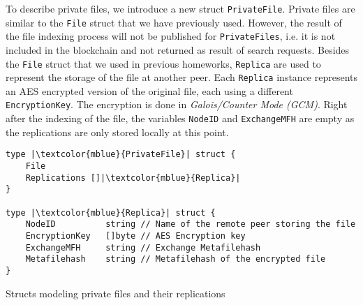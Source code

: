 \documentclass{article}
\begin{document}

To describe private files, we introduce a new struct \texttt{PrivateFile}. Private files are similar to the \texttt{File} struct that we have previously used. However, the result of the file indexing process will not be published for \texttt{PrivateFiles}, i.e. it is not included in the blockchain and not returned as result of search requests. 
Besides the \texttt{File} struct that we used in previous homeworks, \texttt{Replica} are used to represent the storage of the file at another peer. Each \texttt{Replica} instance represents an AES encrypted version of the original file, each using a different \texttt{EncryptionKey}. The encryption is done in \emph{Galois/Counter Mode (GCM)}. Right after the indexing of the file, the variables \texttt{NodeID} and \texttt{ExchangeMFH} are empty as the replications are only stored locally at this point. \\\vspace{0.5em}

\begin{listing}
\begin{verbatim}
type |\textcolor{mblue}{PrivateFile}| struct {
	File
	Replications []|\textcolor{mblue}{Replica}|
}

type |\textcolor{mblue}{Replica}| struct {
	NodeID          string // Name of the remote peer storing the file
	EncryptionKey   []byte // AES Encryption key
	ExchangeMFH     string // Exchange Metafilehash
	Metafilehash    string // Metafilehash of the encrypted file
}
\end{verbatim}
\caption{Structs modeling private files and their replications}
\end{listing}
\end{document}
